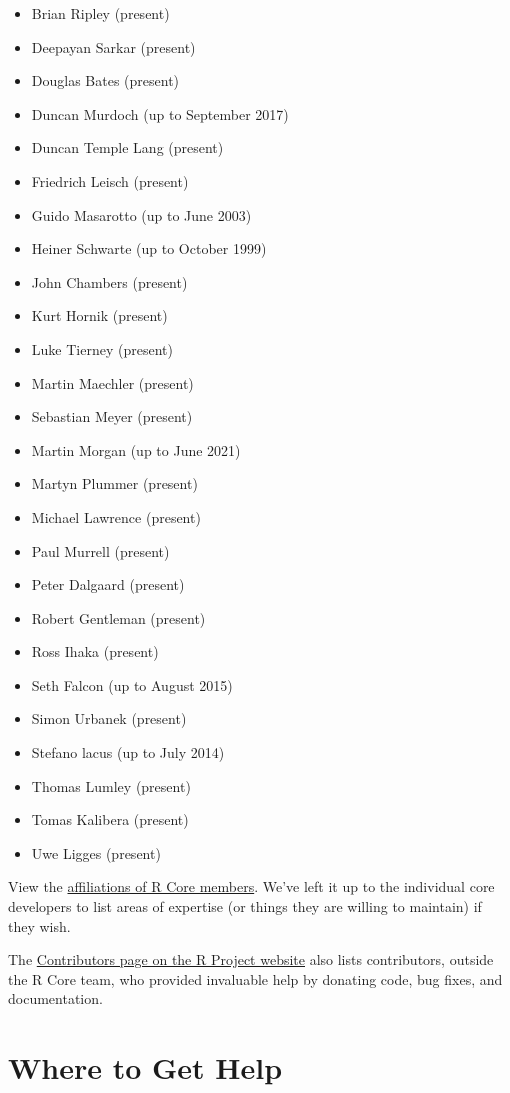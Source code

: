 \documentclass[
]{book}
\providecommand{\tightlist}{%
  \setlength{\itemsep}{0pt}\setlength{\parskip}{0pt}}
\begin{document}
\begin{itemize}
\tightlist
\item
  Brian Ripley (present)
\item
  Deepayan Sarkar (present)
\item
  Douglas Bates (present)
\item
  Duncan Murdoch (up to September 2017)
\item
  Duncan Temple Lang (present)
\item
  Friedrich Leisch (present)
\item
  Guido Masarotto (up to June 2003)
\item
  Heiner Schwarte (up to October 1999)
\item
  John Chambers (present)
\item
  Kurt Hornik (present)
\item
  Luke Tierney (present)
\item
  Martin Maechler (present)
\item
  Sebastian Meyer (present)
\item
  Martin Morgan (up to June 2021)
\item
  Martyn Plummer (present)
\item
  Michael Lawrence (present)
\item
  Paul Murrell (present)
\item
  Peter Dalgaard (present)
\item
  Robert Gentleman (present)
\item
  Ross Ihaka (present)
\item
  Seth Falcon (up to August 2015)
\item
  Simon Urbanek (present)
\item
  Stefano lacus (up to July 2014)
\item
  Thomas Lumley (present)
\item
  Tomas Kalibera (present)
\item
  Uwe Ligges (present)
\end{itemize}

View the \href{}{affiliations of R Core members}. We've left it up to the individual core developers to list areas of expertise (or things they are willing to maintain) if they wish.

The \href{https://www.r-project.org/contributors.html}{Contributors page on the R Project website} also lists contributors, outside the R Core team, who provided invaluable help by donating code, bug fixes, and documentation.

\chapter{Where to Get Help}\label{WhereToGetHelp}
\end{document}
